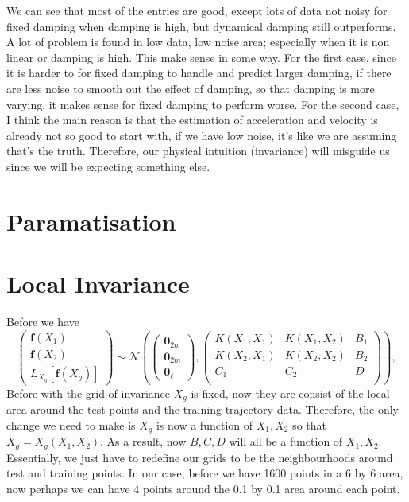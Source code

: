 \documentclass{article}
\begin{document}
We can see that most of the entries are good, except lots of data not noisy for fixed damping when damping is high, but dynamical damping still outperforms.
A lot of problem is found in low data, low noise area; especially when it is non linear or damping is high. 
This make sense in some way.
For the first case, since it is harder to for fixed damping to handle and predict larger damping, if there are less noise to smooth out the effect of damping, so that damping is more varying, it makes sense for fixed damping to perform worse. 
For the second case, I think the main reason is that the estimation of acceleration and velocity is already not so good to start with, if we have low noise, it's like we are assuming that's the truth.
Therefore, our physical intuition (invariance) will misguide us since we will be expecting something else. 
\section*{Paramatisation}
\section*{Local Invariance}
Before we have
$$
\begin{pmatrix}
  \mathbf{f}(X_1)\\\mathbf{f}(X_2) \\ L_{X_g}[\mathbf{f}(X_g)]
\end{pmatrix}
\sim \mathcal{N}
\left(
\begin{pmatrix}
  \mathbf{0}_{2n} \\ \mathbf{0}_{2m} \\ \mathbf{0}_{\ell}
\end{pmatrix},
\begin{pmatrix}
K(X_1, X_1) & K(X_1, X_2) & B_1 \\
K(X_2, X_1) & K(X_2, X_2) & B_2 \\
C_1         & C_2         & D \\
\end{pmatrix}
\right), 
$$
Before with the grid of invariance $X_g$ is fixed, now they are consist of the local area around the test points and the training trajectory data. 
Therefore, the only change we need to make is $X_g$ is now a function of $X_1, X_2$ so that $X_g = X_g(X_1, X_2)$.
As a result, now $B, C, D$ will all be a function of $X_1, X_2.$
Essentially, we just have to redefine our grids to be the neighbourhoods around test and training points.  
In our case, before we have 1600 points in a 6 by 6 area, now perhaps we can have 4 points around the 0.1 by 0.1 area around each point. 
\end{document}
